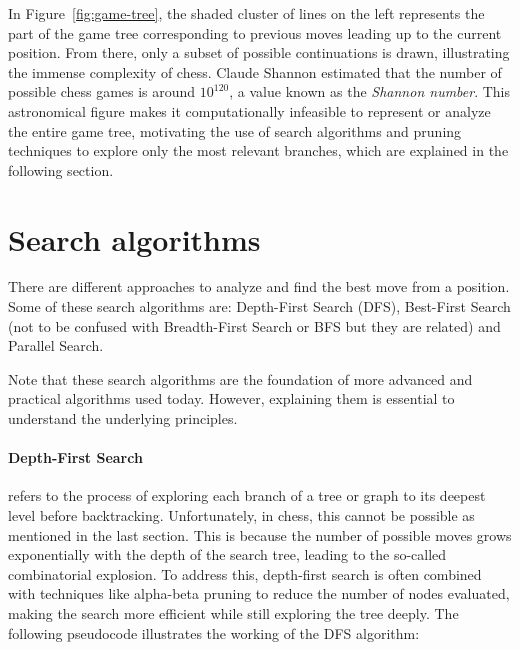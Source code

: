 \vspace{1em}

\noindent In Figure~\ref{fig:game-tree}, the shaded cluster of lines on the left represents the part of the game tree corresponding to previous moves leading up to the current position. From there, only a subset of possible continuations is drawn, illustrating the immense complexity of chess. Claude Shannon estimated that the number of possible chess games is around $10^{120}$, a value known as the \textit{Shannon number}. This astronomical figure makes it computationally infeasible to represent or analyze the entire game tree, motivating the use of search algorithms and pruning techniques to explore only the most relevant branches, which are explained in the following section.

\section{Search algorithms}

There are different approaches to analyze and find the best move from a position. Some of these search algorithms are: Depth-First Search (DFS), Best-First Search (not to be confused with Breadth-First Search or BFS but they are related) and Parallel Search.

\vspace{1em}

\noindent Note that these search algorithms are the foundation of more advanced and practical algorithms used today. However, explaining them is essential to understand the underlying principles.

\paragraph{Depth-First Search} refers to the process of exploring each branch of a tree or graph to its deepest level before backtracking. Unfortunately, in chess, this cannot be possible as mentioned in the last section. This is because the number of possible moves grows exponentially with the depth of the search tree, leading to the so-called combinatorial explosion. To address this, depth-first search is often combined with techniques like alpha-beta pruning to reduce the number of nodes evaluated, making the search more efficient while still exploring the tree deeply. The following pseudocode illustrates the working of the DFS algorithm:

\vspace{1em}

